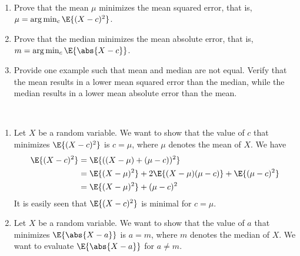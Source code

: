 	\begin{exercise}\label{ex:chap06:mu c}~
		\begin{enumerate}
			\item Prove that the mean $\mu$ minimizes the mean squared error, that is, $\mu = \arg \min_c \E{(X - c)^2}$.
			\item Prove that the median minimizes the mean absolute error, that is, $m = \arg \min_c \E{\abs{X - c}}$.
			\item Provide one example such that mean and median are not equal. Verify that the mean results in a lower mean squared error than the median, while the median results in a lower mean absolute error than the mean. 
		\end{enumerate}
		\begin{solution}~
			\begin{enumerate}
				\item Let $X$ be a random variable. We want to show that the value of $c$ that minimizes $\E{(X - c)^2}$ is $c = \mu$, where $\mu$ denotes the mean of $X$. We have
				\begin{align*}
					\E{(X - c)^2} & = \E{((X - \mu) + (\mu - c))^2} \\
					& = \E{(X - \mu)^2} + 2 \E{(X - \mu)(\mu - c)} + \E{(\mu - c)^2} \\
					& = \E{(X - \mu)^2} + (\mu - c)^2
				\end{align*}
				It is easily seen that $\E{(X - c)^2}$ is minimal for $c = \mu$.
				\item Let $X$ be a random variable. We want to show that the value of $a$ that minimizes $\E{\abs{X - a}}$ is $a = m$, where $m$ denotes the median of $X$. We want to evaluate $\E{\abs{X - a}}$ for $a \neq m$.
					

\end{enumerate}
\end{solution}
\end{exercise}
